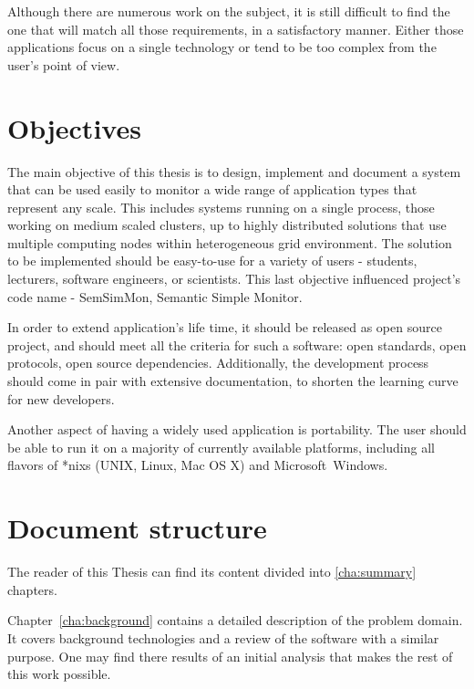 Although there are numerous work on the subject, it is still difficult to find the one that will match all those requirements, in a satisfactory manner. Either those applications focus on a single technology or tend to be too complex from the user\rq{}s point of view.


\section{Objectives}
\label{ch1:Objectives}

The main objective of this thesis is to design, implement and document a system that can be used easily to monitor a wide range of application types that represent any scale. This includes systems running on a single process, those working on medium scaled clusters, up to highly distributed solutions that use multiple computing nodes within heterogeneous grid environment. The solution to be implemented should be easy-to-use for a variety of users - students, lecturers, software engineers, or scientists. This last objective influenced project's code name - SemSimMon, Semantic Simple Monitor.

In order to extend application's life time, it should be released as open source project, and should meet all the criteria for such a software: open standards, open protocols, open source dependencies. Additionally, the development process should come in pair with extensive documentation, to shorten the learning curve for new developers.

Another aspect of having a widely used application is portability. The user should be able to run it on a majority of currently available platforms, including all flavors of *nixs (UNIX, Linux, Mac OS X\textregistered) and Microsoft\textregistered~Windows\textregistered. 

\section{Document structure}
\label{ch1:docStructure}

The reader of this Thesis can find its content divided into \ref{cha:summary} chapters.

Chapter~\ref{cha:background} contains a detailed description of the problem domain. It covers background technologies and a review of the software with a similar purpose. One may find there results of an initial analysis that makes the rest of this work possible.

